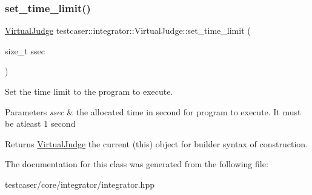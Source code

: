\subsubsection{\texorpdfstring{set\_time\_limit()}{set\_time\_limit()}}
{\footnotesize\ttfamily \mbox{\hyperlink{classtestcaser_1_1integrator_1_1VirtualJudge}{Virtual\+Judge}} testcaser\+::integrator\+::\+Virtual\+Judge\+::set\+\_\+time\+\_\+limit (\begin{DoxyParamCaption}\item[{size\+\_\+t}]{ssec }\end{DoxyParamCaption})\hspace{0.3cm}{\ttfamily [inline]}}



Set the time limit to the program to execute. 


\begin{DoxyParams}{Parameters}
{\em ssec} & the allocated time in second for program to execute. It must be atleast 1 second \\
\hline
\end{DoxyParams}
\begin{DoxyReturn}{Returns}
\mbox{\hyperlink{classtestcaser_1_1integrator_1_1VirtualJudge}{Virtual\+Judge}} the current (this) object for builder syntax of construction. 
\end{DoxyReturn}


The documentation for this class was generated from the following file\+:\begin{DoxyCompactItemize}
\item 
testcaser/core/integrator/integrator.\+hpp\end{DoxyCompactItemize}
